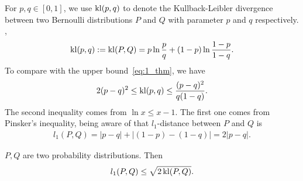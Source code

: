 For $p, q\in[0,1]$,
we use ${\mathop{\mathrm{kl}}} (p, q)$ to denote the Kullback-Leibler divergence between two
Bernoulli distributions $P$ and $Q$ with parameter $p$ and $q$ respectively. \ie,
\begin{equation}
    {\mathop{\mathrm{kl}}}(p,q) := {\mathop{\mathrm{kl}}}(P,Q) = p\ln\frac{p}{q} +(1-p)\ln \frac{1-p}{1-q}.
\end{equation}
To compare with the upper bound~\eqref{eq:1_thm}, we have
\begin{align}
    2(p-q)^2 \le {\mathop{\mathrm{kl}}}(p,q) \le \frac{(p-q)^2}{q(1-q)}.
\end{align}
The second inequality comes from $\ln x\le x-1$.
The first one comes from Pinsker's inequality,
being aware of that $l_1$-distance between $P$ and $Q$ is
\begin{align}
    l_1(P,Q) = |p-q|+|(1-p)-(1-q)| = 2|p-q|.
\end{align}
\begin{framed}
    \begin{fact}
        $P, Q$ are two probability distributions. Then
        \begin{align}
            l_1(P, Q) \le \sqrt{2\,{\mathop{\mathrm{kl}}}(P,Q)}.
        \end{align}
    \end{fact}
\end{framed}

